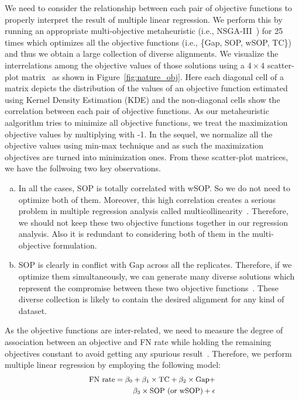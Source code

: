 We need to consider the relationship between each pair of objective functions to properly interpret the result of multiple linear regression. We perform this by running an appropriate multi-objective metaheuristic (i.e., NSGA-III~\citep{deb2014evolutionary}) for 25 times which optimizes all the objective functions (i.e., \{Gap, SOP, wSOP, TC\})  and thus we obtain a large collection of diverse alignments. We visualize the interrelations among the objective values of those solutions using a $ 4\times4 $ scatter-plot matrix~\cite{kalyanmoy2001multi} as shown in Figure~\ref{fig:nature_obj}. Here each diagonal cell of a matrix depicts the distribution of the values of an objective function estimated using Kernel Density Estimation (KDE) and the non-diagonal cells show the correlation between each pair of objective functions. As our metaheuristic aalgorithm tries to minimize all objective functions, we treat the maximization objective values by multiplying with -1. In the sequel, we normalize all the objective values using min-max technique and as such the maximization objectives are turned into minimization ones. From these scatter-plot matrices, we have the follwoing two key observations.
\begin{enumerate}[(a)]
	
	\item In all the cases, SOP is totally correlated with wSOP. So we do not need to optimize both of them. Moreover, this high correlation creates a serious problem in multiple regression analysis called multicollinearity~\citep{montgomery2012introduction}. Therefore, we should not keep these two objective functions together in our regression analysis. Also it is redundant to considering both of them in the multi-objective formulation. 
	
	\item SOP is clearly in conflict with Gap across all the replicates. Therefore, if we optimize them simultaneously, we can generate many diverse solutions which represent the compromise between these two objective functions~\citep{kalyanmoy2001multi}. These diverse collection is likely to contain the desired alignment for any kind of dataset.
	
\end{enumerate}

As the objective functions are inter-related, we need to measure the degree of association between an objective and FN rate while holding the remaining objectives constant to avoid getting any spurious result~\citep{montgomery2012introduction}. Therefore, we perform multiple linear regression by employing the following model:
\begin{equation}
\small
\begin{split}
\text{FN rate} = \beta_0 + \beta_1 \times \text{TC}+ \beta_2 \times \text{Gap} + \\
\beta_3 \times \text{SOP (or wSOP)} + \epsilon \label{eq:multi_lin_reg}
\end{split}
\end{equation}

